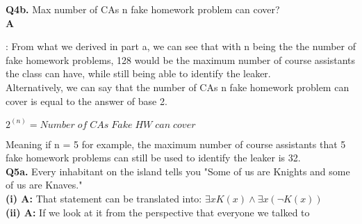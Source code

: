\documentclass[12pt, letterpaper]{article}
\begin{document}
\noindent\textbf{Q4b.} Max number of CAs n fake homework problem can cover?\\

\noindent\textbf{A}{: From what we derived in part a, we can see that with n being the the number of fake homework problems, 128 would be the maximum number of course assistants the class can have, while still being able to identify the leaker.\\

\noindent Alternatively, we can say that the number of CAs n fake homework problem can cover is equal to the answer of base 2.\\

{\large\centerline{$2^{(n)}= Number \; of \; CAs \; Fake \; HW \; can \; cover$}}\vspace{0.5cm}

\noindent Meaning if n = 5 for example, the maximum number of course assistants that 5 fake homework problems can still be used to identify the leaker is 32.\\[0.5in]

\noindent\textbf{Q5a.} Every inhabitant on the island tells you "Some of us are Knights and some of us are Knaves."\\

\textbf{(i) A:} That statement can be translated into:  $\exists xK(x) \land \exists x(\neg K(x))$\\

\textbf{(ii) A:} If we look at it from the perspective that everyone we talked to

\setlength\parindent{80pt}{is a Knight, then that would make the predicate statement from}

\setlength\parindent{80pt}{(i) false since if we have all Knights, some cannot be knaves and}

\setlength\parindent{80pt}{knights cannot lie. If we look at it from the perspective that}

\setlength\parindent{80pt}{everyone we talked to are Knaves, this would make the predicate}

\setlength\parindent{80pt}{false as well, as some cannot be Knights if all are Knaves. However,}

\setlength\parindent{80pt}{because knaves are liars, this means that the statement came from}

\setlength\parindent{80pt}{Knaves, as it was false. This means the inhabitants on the island are}

\setlength\parindent{80pt}{Knaves.}\\

}
\end{document}
